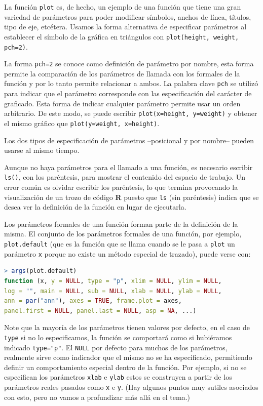 La función \texttt{plot} es, de hecho, un ejemplo de una función que tiene una
gran variedad de parámetros para poder modificar símbolos, anchos de línea,
títulos, tipo de eje, etcétera. Usamos la forma alternativa de especificar
parámetros al establecer el símbolo de la gráfica en triángulos con
\texttt{plot(height, weight, pch=2)}.

La forma \texttt{pch=2} se conoce como definición de parámetro por nombre, esta
forma permite la comparación de los parámetros de llamada con los formales de
la función y por lo tanto permite relacionar a ambos. La palabra clave
\texttt{pch} se utilizó para indicar que el parámetro corresponde con las
especificación del carácter de graficado. Esta forma de indicar cualquier
parámetro permite usar un orden arbitrario. De este modo, se puede escribir
\texttt{plot(x=height, y=weight)} y obtener el mismo gráfico que
\texttt{plot(y=weight, x=height)}.

Los dos tipos de especificación de parámetros --posicional y por nombre-- pueden
usarse al mismo tiempo.

Aunque no haya parámetros para el llamado a una función, es necesario escribir
\texttt{ls()}, con los paréntesis, para mostrar el contenido del espacio de
trabajo. Un error común es olvidar escribir los paréntesis, lo que termina
provocando la visualización de un trozo de código \textbf{R} puesto que
\texttt{ls} (sin paréntesis) indica que se desea ver la definición de la
función en lugar de ejecutarla.

Los parámetros formales de una función forman parte de la definición de la
misma. El conjunto de los parámetros formales de una función, por ejemplo,
\texttt{plot.default} (que es la función que se llama cuando se le pasa a
\texttt{plot} un parámetro \texttt{x} porque no existe un método especial de
trazado), puede verse con:

\begin{lstlisting}[language=R]
> args(plot.default)
function (x, y = NULL, type = "p", xlim = NULL, ylim = NULL,
log = "", main = NULL, sub = NULL, xlab = NULL, ylab = NULL,
ann = par("ann"), axes = TRUE, frame.plot = axes,
panel.first = NULL, panel.last = NULL, asp = NA, ...)
\end{lstlisting}

Note que la mayoría de los parámetros tienen valores por defecto, en el caso de
\texttt{type} si no lo especificamos, la función se comportará como si
hubiéramos indicado \texttt{type="p"}. El \texttt{NULL} por defecto para muchos
de los parámetros, realmente sirve como indicador que el mismo no se ha
especificado, permitiendo definir un comportamiento especial dentro de la
función. Por ejemplo, si no se especifican los parámetros \texttt{xlab} e
\texttt{ylab} estos se construyen a partir de los parámetros reales pasados
como \texttt{x} e \texttt{y}. (Hay algunos puntos muy sutiles asociados con
esto, pero no vamos a profundizar más allá en el tema.)

